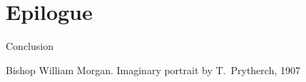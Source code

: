 \section{Epilogue}
 
\begin{frame}{Conclusion}
	\begin{center}

		\vfill

		Bishop William Morgan. Imaginary portrait by T.\ Prytherch, 1907
	\end{center}
\end{frame}
